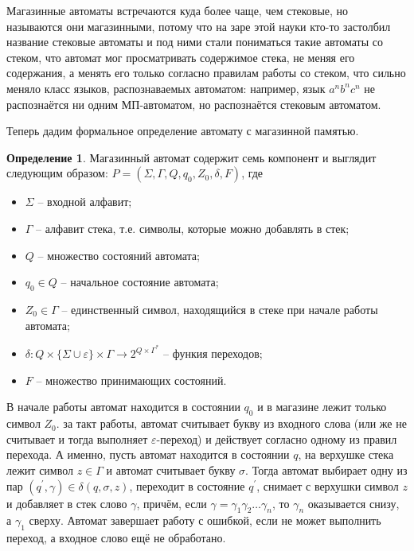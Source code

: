 \documentclass[12pt]{article}
\theoremstyle{definiton}
\theoremstyle{definition}
\theoremstyle{definition}
\newtheorem{Def}{Определение}
\let\eps\varepsilon
\begin{document}
 Магазинные автоматы встречаются куда более чаще, чем стековые, но называются они магазинными, потому что на заре этой науки кто-то застолбил название стековые автоматы и под ними стали пониматься такие автоматы со стеком, что автомат мог просматривать содержимое стека, не меняя его содержания, а менять его только согласно правилам работы со стеком, что сильно меняло класс языков, распознаваемых автоматом: например, язык $a^nb^nc^n$ не распознаётся ни одним МП-автоматом, но распознаётся стековым автоматом.

Теперь дадим формальное определение автомату с магазинной памятью.

\begin{Def}
	Магазинный автомат содержит семь компонент и выглядит следующим образом: $P = (\Sigma, \Gamma, Q, q_0, Z_0, \delta, F)$, где
	\begin{itemize}
		\item $\Sigma$ -- входной алфавит;
		\item $\Gamma$ -- алфавит стека, т.е. символы, которые можно добавлять в стек;
		\item $Q$ -- множество состояний автомата;
		\item $q_0 \in Q$ -- начальное состояние автомата;
		\item $Z_0 \in \Gamma$ -- единственный символ, находящийся в стеке при начале работы автомата;
		\item $ \delta : Q\times\{\Sigma\cup\eps\}\times\Gamma \to 2^{Q\times\Gamma^*}	$ -- функия переходов;
		\item $ F $ -- множество принимающих состояний.
	\end{itemize}
	В начале работы автомат находится в состоянии $q_0$ и в магазине лежит только символ $Z_0$. за такт работы, автомат считывает букву из входного слова (или же не считывает и тогда выполняет $\eps$-переход) и действует согласно одному из правил перехода. А именно, пусть автомат находится в состоянии $q$, на верхушке стека лежит символ $z \in \Gamma$ и автомат считывает букву $\sigma$. Тогда автомат выбирает одну из пар $(q^\prime, \gamma) \in \delta(q,\sigma,z)$, переходит в состояние $q^\prime$, снимает с верхушки символ $z$ и добавляет в стек слово $\gamma$, причём, если $\gamma = \gamma_1\gamma_2\ldots\gamma_n$, то $\gamma_n$ оказывается снизу, а $\gamma_1$ сверху. 
	Автомат завершает работу с ошибкой, если не может выполнить переход, а входное слово ещё не обработано. 
	

\end{Def}
\end{document}
